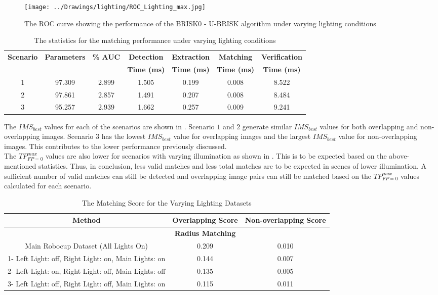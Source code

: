 \begin{figure}[h!] 
  \centering
    \texttt{[image: ../Drawings/lighting/ROC\_Lighting\_max.jpg]}
    \caption{The ROC curve showing the performance of the BRISK0 - U-BRISK algorithm under varying lighting conditions}
    \label{fig:rocLighting}
\end{figure}

\begin{table}
\centering
\caption{The statistics for the matching performance under varying lighting conditions}
\footnotesize
\begin{tabular}{|c|c|c|c|c|c|c|}
\hline 
\textbf{Scenario} & \textbf{Parameters} & \textbf{\% AUC} & \textbf{Detection} & \textbf{Extraction} & \textbf{Matching} & \textbf{Verification}\tabularnewline
 &  &  & \textbf{Time (ms)} & \textbf{Time (ms)} & \textbf{Time (ms)} & \textbf{Time (ms)}\tabularnewline
\hline 
\hline 
1 & 97.309 & 2.899 & 1.505 & 0.199 & 0.008 & 8.522\tabularnewline
\hline 
2 & 97.861 & 2.857 & 1.491 & 0.207 & 0.008 & 8.484\tabularnewline
\hline 
3 & 95.257 & 2.939 & 1.662 & 0.257 & 0.009 & 9.241\tabularnewline
\hline 
\end{tabular}
\label{tab:lightingStats}
\end{table}




The $IMS_{best}$ values for each of the scenarios are shown in . Scenario $1$ and $2$ generate similar $IMS_{best}$ values for both overlapping and non-overlapping images. Scenario $3$ has the lowest $IMS_{best}$ value for overlapping images and the largest $IMS_{best}$ value for non-overlapping images. This contributes to the lower performance previously discussed.\\

The $TP_{FP=0}^{max}$ values are also lower for scenarios with varying illumination as shown in . This is to be expected based on the above-mentioned statistics. Thus, in conclusion, less valid matches and less total matches are to be expected in scenes of lower illumination. A sufficient number of valid matches can still be detected and overlapping image pairs can still be matched based on the $TP_{FP=0}^{max}$ values calculated for each scenario.\\

\begin{table}
\centering
\caption{The Matching Score for the Varying Lighting Datasets}
\begin{tabular}{|c|c|c|}
\hline 
\multicolumn{1}{|c||}{\textbf{Method}} & \multicolumn{1}{c||}{\textbf{Overlapping Score}} & \multicolumn{1}{c|}{\textbf{Non-overlapping Score}}\tabularnewline
\hline 
\hline 
 & \textbf{Radius Matching} & \tabularnewline
\hline 
Main Robocup Dataset (All Lights On) & 0.209 & 0.010\tabularnewline
\hline 
1- Left Light: off, Right Light: on, Main Lights: on & 0.144 & 0.007\tabularnewline
\hline 
2- Left Light: on, Right Light: off, Main Lights: off & 0.135 & 0.005\tabularnewline
\hline 
3- Left Light: off, Right Light: off, Main Lights: on & 0.115 & 0.011\tabularnewline
\hline 
\end{tabular}
\label{tab:ms_lighting}
\end{table}

